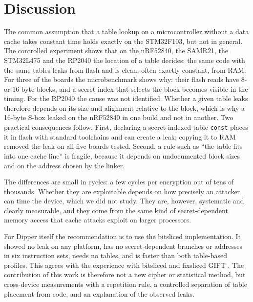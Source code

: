 \documentclass[11pt, a4paper, twoside, reqno]{article}
\begin{document}
\section{Discussion}

The common assumption that a table lookup on a microcontroller without a data cache takes constant time holds exactly on the STM32F103, but not in general. The controlled experiment shows that on the nRF52840, the SAMR21, the STM32L475 and the RP2040 the location of a table decides: the same code with the same tables leaks from flash and is clean, often exactly constant, from RAM. For three of the boards the microbenchmark shows why: their flash reads have 8- or 16-byte blocks, and a secret index that selects the block becomes visible in the timing. For the RP2040 the cause was not identified. Whether a given table leaks therefore depends on its size and alignment relative to the block, which is why a 16-byte S-box leaked on the nRF52840 in one build and not in another. Two practical consequences follow. First, declaring a secret-indexed table \texttt{const} places it in flash with standard toolchains and can create a leak; copying it to RAM removed the leak on all five boards tested. Second, a rule such as ``the table fits into one cache line'' is fragile, because it depends on undocumented block sizes and on the address chosen by the linker.

The differences are small in cycles: a few cycles per encryption out of tens of thousands. Whether they are exploitable depends on how precisely an attacker can time the device, which we did not study. They are, however, systematic and clearly measurable, and they come from the same kind of secret-dependent memory access that cache attacks exploit on larger processors.

For Dipper itself the recommendation is to use the bitsliced implementation. It showed no leak on any platform, has no secret-dependent branches or addresses in six instruction sets, needs no tables, and is faster than both table-based profiles. This agrees with the experience with bitsliced and fixsliced GIFT \citep{adomnicai2020}. The contribution of this work is therefore not a new cipher or statistical method, but cross-device measurements with a repetition rule, a controlled separation of table placement from code, and an explanation of the observed leaks.
\end{document}
